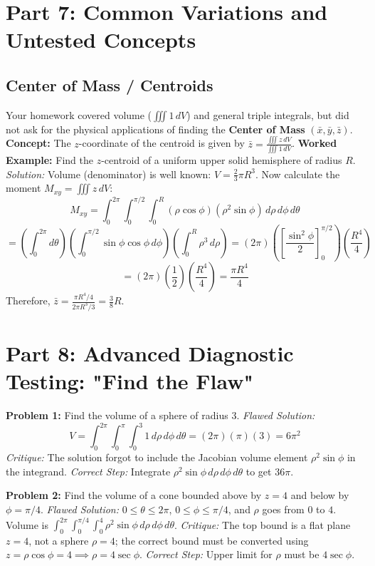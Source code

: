\documentclass[12pt]{article}
\begin{document}
\newpage
\section{Part 7: Common Variations and Untested Concepts}

\subsection{Center of Mass / Centroids}
Your homework covered volume ($\iiint 1 \, dV$) and general triple integrals, but did not ask for the physical applications of finding the \textbf{Center of Mass} $(\bar{x}, \bar{y}, \bar{z})$.
\textbf{Concept:} The $z$-coordinate of the centroid is given by $\bar{z} = \frac{\iiint z \, dV}{\iiint 1 \, dV}$.
\textbf{Worked Example:} Find the $z$-centroid of a uniform upper solid hemisphere of radius $R$.
\textit{Solution:}
Volume (denominator) is well known: $V = \frac{2}{3}\pi R^3$.
Now calculate the moment $M_{xy} = \iiint z \, dV$:
\[ M_{xy} = \int_0^{2\pi} \int_0^{\pi/2} \int_0^R (\rho\cos\phi) (\rho^2\sin\phi) \, d\rho \, d\phi \, d\theta \]
\[ = \left( \int_0^{2\pi} d\theta \right) \left( \int_0^{\pi/2} \sin\phi \cos\phi \, d\phi \right) \left( \int_0^R \rho^3 \, d\rho \right) = (2\pi) \left( \left[ \frac{\sin^2\phi}{2} \right]_0^{\pi/2} \right) \left( \frac{R^4}{4} \right) \]
\[ = (2\pi) \left(\frac{1}{2}\right) \left(\frac{R^4}{4}\right) = \frac{\pi R^4}{4} \]
Therefore, $\bar{z} = \frac{\pi R^4 / 4}{2\pi R^3 / 3} = \frac{3}{8}R$.

\newpage
\section{Part 8: Advanced Diagnostic Testing: "Find the Flaw"}

\textbf{Problem 1:} Find the volume of a sphere of radius 3.
\textit{Flawed Solution:} 
\[ V = \int_0^{2\pi} \int_0^\pi \int_0^3 1 \, d\rho \, d\phi \, d\theta = (2\pi)(\pi)(3) = 6\pi^2 \]
\textit{Critique:} The solution forgot to include the Jacobian volume element $\rho^2 \sin\phi$ in the integrand.
\textit{Correct Step:} Integrate $\rho^2 \sin\phi \, d\rho \, d\phi \, d\theta$ to get $36\pi$.

\textbf{Problem 2:} Find the volume of a cone bounded above by $z=4$ and below by $\phi=\pi/4$.
\textit{Flawed Solution:} 
$0 \le \theta \le 2\pi$, $0 \le \phi \le \pi/4$, and $\rho$ goes from $0$ to $4$. Volume is $\int_0^{2\pi} \int_0^{\pi/4} \int_0^4 \rho^2 \sin\phi \, d\rho \, d\phi \, d\theta$.
\textit{Critique:} The top bound is a flat plane $z=4$, not a sphere $\rho=4$; the correct bound must be converted using $z = \rho\cos\phi = 4 \implies \rho = 4\sec\phi$.
\textit{Correct Step:} Upper limit for $\rho$ must be $4\sec\phi$.
\end{document}
